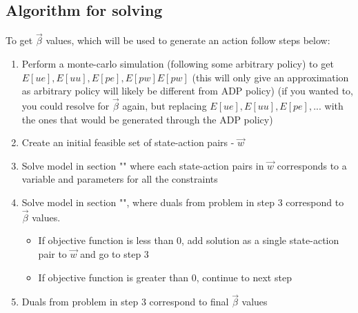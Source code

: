 \documentclass{article}
\begin{document}
\subsection{Algorithm for solving}
To get $\vec{\beta}$ values, which will be used to generate an action follow steps below:
\begin{enumerate}
	\item Perform a monte-carlo simulation (following some arbitrary policy) to get $E[ue], E[uu], E[pe], E[pw] E[pw]$ (this will only give an approximation as arbitrary policy will likely be different from ADP policy) (if you wanted to, you could resolve for $\vec{\beta}$ again, but replacing $E[ue], E[uu], E[pe], ...$ with the ones that would be generated through the ADP policy) 
	\item Create an initial feasible set of state-action pairs - $\vec{w}$
	\item Solve model in section "" where each state-action pairs in $\vec{w}$ corresponds to a variable and parameters for all the constraints
	\item Solve model in section "", where duals from problem in step 3  correspond to $\vec{\beta}$ values. 
		\begin{itemize}
			\item If objective function is less than 0, add solution as a single state-action pair to $\vec{w}$ and go to step 3
			\item If objective function is greater than 0, continue to next step
		\end{itemize}
	\item Duals from problem in step 3 correspond to final $\vec{\beta}$ values
\end{enumerate}
	
\end{document}
